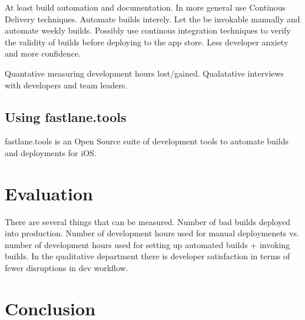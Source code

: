 \documentclass{ituthesis}
\begin{document}
At least build automation and documentation. In more general use Continous Delivery techniques. Automate builds interely. Let the be invokable manually and automate weekly builds. Possibly use continous integration techniques to verify the validity of builds before deploying to the app store. Less developer anxiety and more confidence.

Quantative measuring development hours lost/gained. Qualatative interviews with developers and team leaders.

\section{Using fastlane.tools}

fastlane.tools is an Open Source suite of development tools to automate builds and deployments for iOS. \cite{Krause2015}

\chapter{Evaluation}

There are several things that can be measured. Number of bad builds deployed into production. Number of development hours used for manual deploymenets vs. number of development hours used for setting up automated builds + invoking builds. In the qualitative department there is developer satisfaction in terms of fewer disruptions in dev workflow. 

\chapter{Conclusion}

\clearpage

\renewcommand{\bibname}{References}

\end{document}
